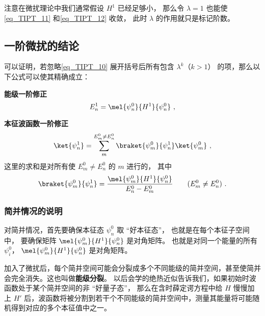 注意在微扰理论中我们通常假设 $H^1$ 已经足够小， 那么令 $\lambda = 1$ 也能使\autoref{eq_TIPT_11} 和\autoref{eq_TIPT_12} 收敛， 此时 $\lambda$ 的作用就只是标记阶数。

\subsection{一阶微扰的结论}
可以证明，若忽略\autoref{eq_TIPT_10} 展开括号后所有包含 $\lambda^k$（$k>1$） 的项，那么以下公式可以使其精确成立：

\textbf{能级一阶修正}
\begin{equation}\label{eq_TIPT_6}
E_n^1 = \mel{\psi_n^0}{H^1}{\psi_n^0}~,
\end{equation}

\textbf{本征波函数一阶修正}
\begin{equation}\label{eq_TIPT_5}
\ket{\psi_n^1} = \sum_m^{E_m^0 \ne E_n^0} \braket{\psi_m^0}{\psi_n^1} \ket{\psi_m^0}~,
\end{equation}
这里的求和是对所有使 $E_m^0 \ne E_n^0$ 的 $m$ 进行的， 其中
\begin{equation}\label{eq_TIPT_4}
\braket{\psi_m^0}{\psi_n^1} = \frac{\mel{\psi_m^0}{H^1}{\psi_n^0}}{E_n^0 - E_m^0} \qquad (E_m^0 \ne E_n^0)~.
\end{equation}

\subsubsection{简并情况的说明}
对简并情况，首先要确保本征态 $\psi_n^0$ 取 “好本征态”， 也就是在每个本征子空间中， 要确保矩阵 $\mel{\psi_m^0}{H^1}{\psi_n^0}$ 是对角矩阵。 也就是对同一个能量的所有 $\psi_i^0$， $\mel{\psi_m^0}{H^1}{\psi_n^0}$ 是对角矩阵。

加入了微扰后，每个简并空间可能会分裂成多个不同能级的简并空间，甚至使简并会完全消失。这也叫做\textbf{能级分裂}。 以后会学的绝热近似告诉我们，如果初始时波函数处于某个简并空间的非 “好量子态”， 那么在含时薛定谔方程中给 $H$ 慢慢加上 $H'$ 后，波函数将被分割到若干个不同能级的简并空间中，测量其能量将可能随机得到对应的多个本征值中之一。

